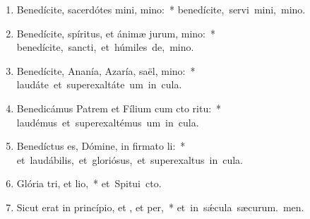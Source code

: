 \begin{flushleft}
\begin{enumerate}[leftmargin=*]
\item Benedícite, sacerdótes mini, mino:~* \mbox{benedícite, servi mini, mino.}
\item Benedícite, spíritus, et ánimæ jurum, mino:~* \mbox{benedícite, sancti, et húmiles de, mino.}
\item Benedícite, Ananía, Azaría, saël, mino:~* \mbox{laudáte et superexaltáte um in cula.}
\item Benedicámus Patrem et Fílium cum cto ritu:~* \mbox{laudémus et superexaltémus um in cula.}
\item Benedíctus es, Dómine, in firmato li:~* \mbox{et laudábilis, et gloriósus, et superexaltus in cula.}
\item Glória tri, et lio,~* \mbox{et Spitui cto.}
\item Sicut erat in princípio, et , et per,~* \mbox{et in s\'{\ae}cula sæcurum. men.}

\end{enumerate}
\end{flushleft}

